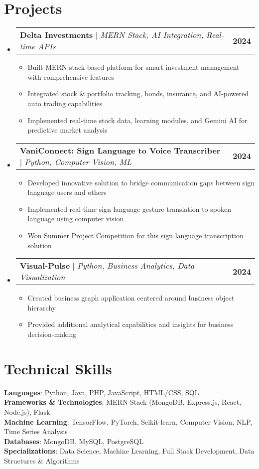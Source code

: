 \documentclass[letterpaper,11pt]{article}
\makeatletter
\newcommand{\resumeItem}[1]{
  \item\small{
    {#1 \vspace{-2pt}}
  }
}
\newcommand{\resumeProjectHeading}[2]{
    \item
    \begin{tabular*}{1.001\textwidth}{l@{\extracolsep{\fill}}r}
      \small#1 & \textbf{\small #2}\\
    \end{tabular*}\vspace{-7pt}
}
\newcommand{\resumeSubHeadingListStart}{\begin{itemize}[leftmargin=0.0in, label={}]}
\newcommand{\resumeSubHeadingListEnd}{\end{itemize}}
\newcommand{\resumeItemListStart}{\begin{itemize}}
\newcommand{\resumeItemListEnd}{\end{itemize}\vspace{-5pt}}
\makeatother
\begin{document}
\section{Projects}
    \vspace{-5pt}
    \resumeSubHeadingListStart
      \resumeProjectHeading
          {\textbf{Delta Investments} $|$ \emph{MERN Stack, AI Integration, Real-time APIs}}{2024}
          \resumeItemListStart
            \resumeItem{Built MERN stack-based platform for smart investment management with comprehensive features}
            \resumeItem{Integrated stock \& portfolio tracking, bonds, insurance, and AI-powered auto trading capabilities}
            \resumeItem{Implemented real-time stock data, learning modules, and Gemini AI for predictive market analysis}
          \resumeItemListEnd
          \vspace{-13pt}
      \resumeProjectHeading
          {\textbf{VaniConnect: Sign Language to Voice Transcriber} $|$ \emph{Python, Computer Vision, ML}}{2024}
          \resumeItemListStart
            \resumeItem{Developed innovative solution to bridge communication gaps between sign language users and others}
            \resumeItem{Implemented real-time sign language gesture translation to spoken language using computer vision}
            \resumeItem{Won Summer Project Competition for this sign language transcription solution}
          \resumeItemListEnd 
          \vspace{-13pt}
      \resumeProjectHeading
          {\textbf{Visual-Pulse} $|$ \emph{Python, Business Analytics, Data Visualization}}{2024}
          \resumeItemListStart
            \resumeItem{Created business graph application centered around business object hierarchy}
            \resumeItem{Provided additional analytical capabilities and insights for business decision-making}
          \resumeItemListEnd
    \resumeSubHeadingListEnd
\vspace{-15pt}

\section{Technical Skills}
 \begin{itemize}[leftmargin=0.15in, label={}]
    \small{\item{
     \textbf{Languages}{: Python, Java, PHP, JavaScript, HTML/CSS, SQL} \\
     \textbf{Frameworks \& Technologies}{: MERN Stack (MongoDB, Express.js, React, Node.js), Flask} \\
     \textbf{Machine Learning}{: TensorFlow, PyTorch, Scikit-learn, Computer Vision, NLP, Time Series Analysis} \\
     \textbf{Databases}{: MongoDB, MySQL, PostgreSQL} \\
     \textbf{Specializations}{: Data Science, Machine Learning, Full Stack Development, Data Structures \& Algorithms}
    }}
 \end{itemize}
 \vspace{-16pt}
\end{document}
